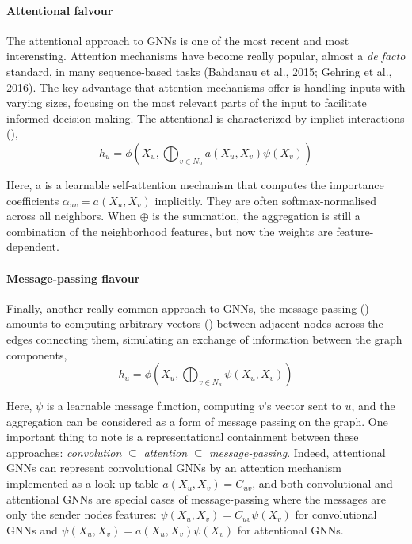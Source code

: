 \documentclass[binding=0.6cm]{sapthesis}
\begin{document}
\paragraph{Attentional falvour}
\label{sec:bg.gnn.gat}
The attentional approach to GNNs is one of the most recent and most interensting. Attention mechanisms have become really popular, almost a \textit{de facto} standard, in many sequence-based tasks (Bahdanau et al., 2015; Gehring et al., 2016). The key advantage that attention mechanisms offer is handling inputs with varying sizes, focusing on the most relevant parts of the input to facilitate informed decision-making.
The attentional  is characterized by implict interactions (\cite{veličković2018gat,monti2016-geometric-mixture,zhang2018-gaan}),
\begin{equation}
    h_u = \phi \left( X_u, \bigoplus_{v \in N_u} a(X_u,X_v) \psi(X_v) \right)
\end{equation}

Here, a is a learnable self-attention mechanism that computes the importance coefficients $\alpha_{uv} = a(X_u, X_v)$ implicitly. They are often softmax-normalised across all neighbors. When $\oplus$ is the summation, the aggregation is still a combination of the neighborhood features, but now the weights are feature-dependent.

\bigskip
\paragraph{Message-passing flavour}
\label{sec:bg.gnn.mp-arch}
Finally, another really common approach to GNNs, the message-passing  (\cite{gilmer2017-message-passing,battaglia2018-relational}) amounts to computing arbitrary vectors () between adjacent nodes across the edges connecting them, simulating an exchange of information between the graph components,
\begin{equation}
    h_u = \phi \left( X_u, \bigoplus_{v \in N_u} \psi(X_u,X_v) \right)
\end{equation}

Here, $\psi$ is a learnable message function, computing $v$’s vector sent to $u$, and the aggregation can be considered as a form of message passing on the graph. One important thing to note is a representational containment between these approaches: \textit{convolution} $\subseteq$ \textit{attention} $\subseteq$ \textit{message-passing}.  Indeed, attentional
GNNs can represent convolutional GNNs by an attention mechanism implemented as a look-up table $a(X_u, X_v) = C_{uv}$, and both convolutional and attentional GNNs are special cases of message-passing where the messages are only the sender nodes features: $\psi(X_u, X_v) = C_{uv}\psi(X_v)$ for convolutional GNNs and $\psi(X_u, X_v) = a(X_u, X_v)\psi(X_v)$ for attentional GNNs.
\end{document}
